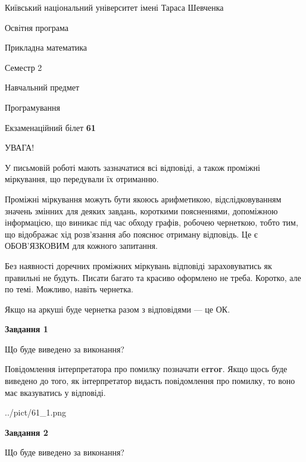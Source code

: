 \documentclass[12pt, ukrainian]{article}
\begin{document}
{{\begin {small}\par
{ \center  Київський національний університет імені Тараса Шевченка \par}
{\parbox {5 cm}{Освітня програма \hfill}{\parbox {7 cm}{Прикладна математика \hfill}}\parbox {6 cm}{\hfill Семестр 2}}\par
{\parbox {5 cm} {Навчальний предмет \hfill}\parbox {7 cm}{Програмування \hfill}\parbox {6cm}{\hfill}\par}\vspace{-7pt} \end{small}}{\center Екзаменаційний білет \No \textbf
{ 61 }\par}}
{
\begin {large}
УВАГА!

У письмовій роботі мають зазначатися всі відповіді, а також проміжні міркування, що передували їх отриманню.

Проміжні міркування можуть бути якоюсь арифметикою, відслідковуванням зна\-чень змінних для деяких завдань,
короткими поясненнями, допоміжною інформацією, що виникає під час обходу графів, робочею чернеткою,
тобто тим, що відображає хід розв’язання або пояснює отриману відповідь.
Це є ОБОВ’ЯЗКОВИМ для кожного запитання.

Без наявності доречних проміжних міркувань відповіді зараховуватись як правиль\-ні не будуть.
Писати багато та красиво оформлено не треба. Коротко, але по темі. Можли\-во, навіть чернетка.

Якщо на аркуші буде чернетка разом з відповідями --- це ОК.

\newpage

{\begin {center}\textbf{Завдання 1}\end {center}}\par
Що буде виведено за виконання?

Повідомлення інтерпретатора про помилку позначати \textbf{error}.
Якщо щось буде виведено до того, як інтерпретатор видасть повідомлення про помилку, 
то воно має вказуватись у відповіді. \par


\begin{center}
	{../pict/61_1.png}
\end{center}
\newpage

{\begin {center}\textbf{Завдання 2}\end {center}}\par
Що буде виведено за виконання?


\end{large}}
\end{document}
